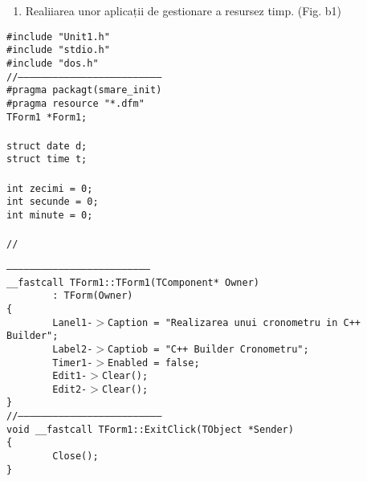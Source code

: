 \documentclass[10pt]{article}
\begin{document}
\begin{enumerate}
	\item {\large Realiiarea unor aplicații de gestionare a resursez timp. (Fig. b1)}
\end{enumerate}

{\raggedright
\texttt{\#include "Unit1.h"
\\
\#include "stdio.h"
\\
\#include "dos.h"
\\
//---------------------------------------------------------------------------
\\
\#pragma packagt(smare\_init)
\\
\#pragma resource "*.dfm"
\\
TForm1 *Form1;
\\

\\
struct date d;
\\
struct time t;
\\

\\
int zecimi = 0;
\\
int secunde = 0;
\\
int minute = 0;
\\

\\
//}
}

{\raggedright
\texttt{---------------------------------------------------------------------------
\\
\_\_fastcall TForm1::TForm1(TComponent* Owner)
\\
~ ~ ~ ~ : TForm(Owner)
\\
\{
\\
~ ~ ~ ~ Lanel1-$>$Caption = "Realizarea unui cronometru in C++ Builder";
\\
~ ~ ~ ~ Label2-$>$Captiob = "C++ Builder Cronometru";
\\
~ ~ ~ ~ Timer1-$>$Enabled = false;
\\
~ ~ ~ ~ Edit1-$>$Clear();
\\
~ ~ ~ ~ Edit2-$>$Clear();
\\
\}
\\
//---------------------------------------------------------------------------
\\
void \_\_fastcall TForm1::ExitClick(TObject *Sender)
\\
\{
\\
~ ~ ~ ~ Close(); ~ ~ ~ ~
\\
\}
\\
}
}
\end{document}
